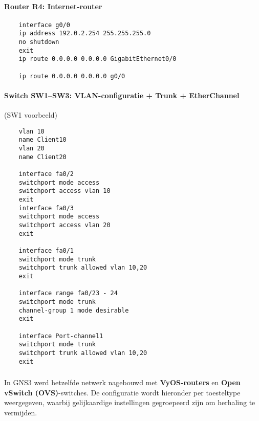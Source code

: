 \vspace{0.3cm}

\paragraph{Router R4: Internet-router}
\begin{verbatim}
    interface g0/0
    ip address 192.0.2.254 255.255.255.0
    no shutdown
    exit
    ip route 0.0.0.0 0.0.0.0 GigabitEthernet0/0
    
    ip route 0.0.0.0 0.0.0.0 g0/0
\end{verbatim}

\vspace{0.3cm}
\paragraph{Switch SW1–SW3: VLAN-configuratie + Trunk + EtherChannel}
(SW1 voorbeeld)
\begin{verbatim}
    vlan 10
    name Client10
    vlan 20
    name Client20
    
    interface fa0/2
    switchport mode access
    switchport access vlan 10
    exit
    interface fa0/3
    switchport mode access
    switchport access vlan 20
    exit
    
    interface fa0/1
    switchport mode trunk
    switchport trunk allowed vlan 10,20
    exit
    
    interface range fa0/23 - 24
    switchport mode trunk
    channel-group 1 mode desirable
    exit
    
    interface Port-channel1
    switchport mode trunk
    switchport trunk allowed vlan 10,20
    exit
\end{verbatim}



\subsubsection{}
\label{sec:configuratie-Gns3}


In GNS3 werd hetzelfde netwerk nagebouwd met \textbf{VyOS-routers} en \textbf{Open vSwitch (OVS)}-switches. De configuratie wordt hieronder per toesteltype weergegeven, waarbij gelijkaardige instellingen gegroepeerd zijn om herhaling te vermijden.

\vspace{0.3cm}

